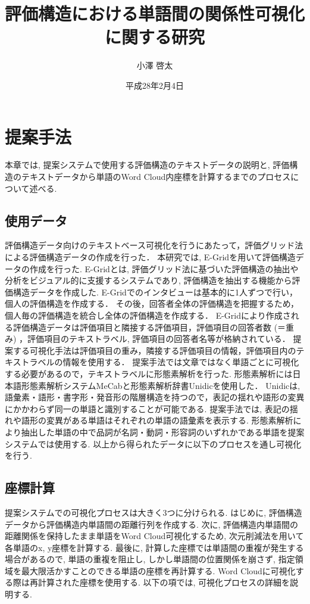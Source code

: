 \documentclass[syuuron]{kuee}
\title{評価構造における単語間の関係性可視化に関する研究}
\author{小澤 啓太}
\date{平成28年2月4日}
\begin{document}
\maketitle
\tableofcontents

\chapter{提案手法}
	本章では, 提案システムで使用する評価構造のテキストデータの説明と, 評価構造のテキストデータから単語のWord Cloud内座標を計算するまでのプロセスについて述べる. 
	
	\section{使用データ}
		評価構造データ向けのテキストベース可視化を行うにあたって，評価グリッド法による評価構造データの作成を行った．
		本研究では, E-Gridを用いて評価構造データの作成を行った. 
		E-Gridとは, 評価グリッド法に基づいた評価構造の抽出や分析をビジュアル的に支援するシステムであり, 
		評価構造を抽出する機能から評価構造データを作成した. 
		E-Gridでのインタビューは基本的に1人ずつで行い，個人の評価構造を作成する．
		その後，回答者全体の評価構造を把握するため，個人毎の評価構造を統合し全体の評価構造を作成する．
		E-Gridにより作成される評価構造データは評価項目と隣接する評価項目，評価項目の回答者数 (＝重み) ，評価項目のテキストラベル, 評価項目の回答者名等が格納されている．
		提案する可視化手法は評価項目の重み，隣接する評価項目の情報，評価項目内のテキストラベルの情報を使用する．
		提案手法では文章ではなく単語ごとに可視化する必要があるので，テキストラベルに形態素解析を行った. 
		形態素解析には日本語形態素解析システムMeCab\cite{mcb1}と形態素解析辞書Unidicを使用した．
		Unidicは, 語彙素・語形・書字形・発音形の階層構造を持つので，表記の揺れや語形の変異にかかわらず同一の単語と識別することが可能である. 
		提案手法では, 表記の揺れや語形の変異がある単語はそれぞれの単語の語彙素を表示する. 
		形態素解析により抽出した単語の中で品詞が名詞・動詞・形容詞のいずれかである単語を提案システムでは使用する. 
		以上から得られたデータに以下のプロセスを通し可視化を行う. 
		
	\section{座標計算}
		提案システムでの可視化プロセスは大きく3つに分けられる. 
		はじめに, 評価構造データから評価構造内単語間の距離行列を作成する. 
		次に, 評価構造内単語間の距離関係を保持したまま単語をWord Cloud可視化するため, 次元削減法を用いて各単語のx, y座標を計算する. 
		最後に, 計算した座標では単語間の重複が発生する場合があるので, 
		単語の重複を阻止し, しかし単語間の位置関係を崩さず, 指定領域を最大限活かすことのできる単語の座標を再計算する. 
		Word Cloudに可視化する際は再計算された座標を使用する. 
		以下の項では, 可視化プロセスの詳細を説明する. 
		
\end{document}
